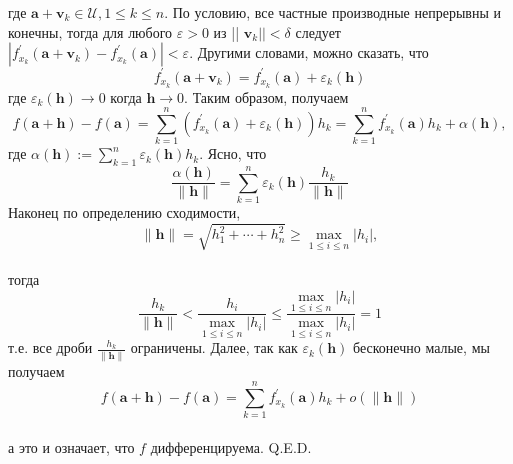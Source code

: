 \documentclass[a4paper]{article}
\begin{document}
где $\mathbf{a}+\mathbf{v}_k \in \mathscr{U}, 1 \leq k \leq n$.
По условию, все частные производные непрерывны и конечны, тогда для любого $\varepsilon>0$ из || $\mathbf{v}_k||<\delta$ следует $\left|f_{x_k}^{\prime}\left(\mathbf{a}+\mathbf{v}_k\right)-f_{x_k}^{\prime}(\mathbf{a})\right|<\varepsilon$. Другими словами, можно сказать, что
$$
f_{x_k}^{\prime}\left(\mathbf{a}+\mathbf{v}_k\right)=f_{x_k}^{\prime}(\mathbf{a})+\varepsilon_k(\mathbf{h})
$$
где $\varepsilon_k(\mathbf{h}) \rightarrow 0$ когда $\mathbf{h} \rightarrow 0$.
Таким образом, получаем
$$
f(\mathbf{a}+\mathbf{h})-f(\mathbf{a})=\sum_{k=1}^n\left(f_{x_k}^{\prime}(\mathbf{a})+\varepsilon_k(\mathbf{h})\right) h_k=\sum_{k=1}^n f_{x_k}^{\prime}(\mathbf{a}) h_k+\alpha(\mathbf{h}),
$$
где $\alpha(\mathbf{h}):=\sum_{k=1}^n \varepsilon_k(\mathbf{h}) h_k$. Ясно, что
$$
\frac{\alpha(\mathbf{h})}{\|\mathbf{h}\|}=\sum_{k=1}^n \varepsilon_k(\mathbf{h}) \frac{h_k}{\|\mathbf{h}\|}
$$
Наконец по определению сходимости,
$$
\|\mathbf{h}\|=\sqrt{h_1^2+\cdots+h_n^2} \geq \max _{1 \leq i \leq n}\left|h_i\right|,
$$\\[2mm]
тогда
$$
\frac{h_k}{\|\mathbf{h}\|}<\frac{h_i}{\max _{1 \leq i \leq n}\left|h_i\right|} \leq \frac{\max _{1 \leq i \leq n}\left|h_i\right|}{\max _{1 \leq i \leq n}\left|h_i\right|}=1
$$
т.е. все дроби $\frac{h_k}{\|\mathbf{h}\|}$ ограничены. Далее, так как $\varepsilon_k(\mathbf{h})$ бесконечно малые, мы получаем
$$
f(\mathbf{a}+\mathbf{h})-f(\mathbf{a})=\sum_{k=1}^n f_{x_k}^{\prime}(\mathbf{a}) h_k+o(\|\mathbf{h}\|)
$$\\[2mm]
а это и означает, что $f$ дифференцируема. Q.E.D.
\end{document}

